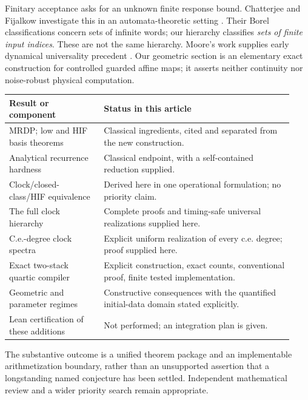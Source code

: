 \documentclass[11pt,letterpaper]{article}
\theoremstyle{definition}
\theoremstyle{remark}
\newcommand{\1}{\mathbf 1}
\begin{document}
Finitary acceptance asks for an unknown finite response bound.
Chatterjee and Fijalkow investigate this in an automata-theoretic setting
\cite{cf2011}. Their Borel classifications concern sets of infinite words;
our hierarchy classifies \emph{sets of finite input indices}. These are
not the same hierarchy. Moore's work supplies early dynamical universality
precedent \cite{moore1990}. Our geometric section is an elementary exact
construction for controlled guarded affine maps; it asserts neither
continuity nor noise-robust physical computation.

\begin{center}
\begin{tabular}{@{}p{0.31\linewidth}p{0.62\linewidth}@{}}
\toprule
Result or component & Status in this article\\
\midrule
MRDP; low and HIF basis theorems & Classical ingredients, cited and separated from the new construction.\\
Analytical recurrence hardness & Classical endpoint, with a self-contained reduction supplied.\\
Clock/closed-class/HIF equivalence & Derived here in one operational formulation; no priority claim.\\
The full clock hierarchy & Complete proofs and timing-safe universal realizations supplied here.\\
C.e.-degree clock spectra & Explicit uniform realization of every c.e. degree; proof supplied here.\\
Exact two-stack quartic compiler & Explicit construction, exact counts, conventional proof, finite tested implementation.\\
Geometric and parameter regimes & Constructive consequences with the quantified initial-data domain stated explicitly.\\
Lean certification of these additions & Not performed; an integration plan is given.\\
\bottomrule
\end{tabular}
\end{center}

The substantive outcome is a unified theorem package and an implementable
arithmetization boundary, rather than an unsupported assertion that a
longstanding named conjecture has been settled. Independent mathematical
review and a wider priority search remain appropriate.
\end{document}
